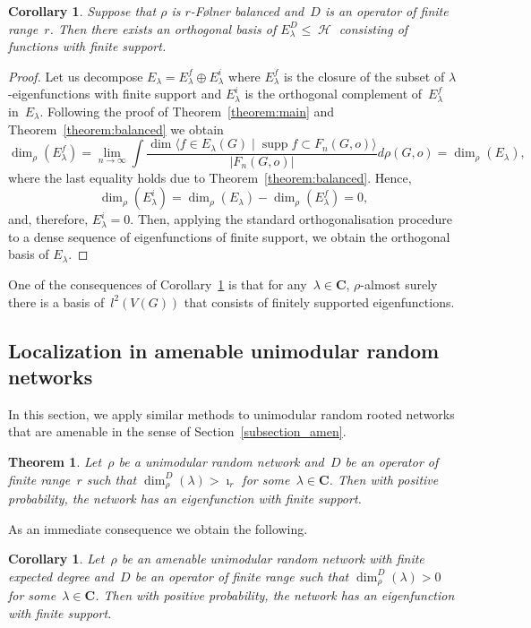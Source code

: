 \documentclass[english]{article}
\newtheorem{corollary}[lemma]{Corollary}
\newtheorem{theorem}[lemma]{Theorem}
\theoremstyle{definition}
\DeclareMathOperator{\supp}{supp}%
\DeclareMathOperator{\Hs}{{\mathcal{H}}}
\newcommand*{\field}[1]{\mathbf{#1}} %
\newcommand*\C{\field{C}} %
\begin{document}
\begin{corollary}\label{corollary:basis}
    Suppose that $\rho$ is $r$-{F\o lner} balanced and~$D$ is an operator of finite range~$r$. Then there exists an orthogonal basis of $E^D_\lambda \le \Hs$ consisting of functions with finite support. 
\end{corollary}
\begin{proof}
    Let us decompose $E_\lambda = E_\lambda^{f} \oplus E_\lambda^{i}$ where $E_\lambda^f$ is the closure of the subset of $\lambda$-eigenfunctions with finite support and $E_\lambda^{i}$ is the orthogonal complement of~$E_\lambda^f$ in~$E_\lambda$.  
    Following the proof of Theorem~\ref{theorem:main} and Theorem~\ref{theorem:balanced} we obtain 
    $$
    \dim_\rho(E_\lambda^f) = \lim_{n \to \infty}\int \frac{\dim \langle f \in E_\lambda(G) \mid \supp f \subset F_n(G,o)\rangle}{|F_n(G,o)|} d\rho(G,o) = \dim_\rho(E_\lambda),
    $$
    where the last equality holds due to Theorem~\ref{theorem:balanced}. Hence, 
    $$
    \dim_\rho(E_\lambda^i) = \dim_\rho(E_\lambda) - \dim_\rho(E_\lambda^f) = 0,
    $$
    and, therefore, $E_\lambda^i = 0$. Then, applying the standard orthogonalisation procedure to a dense sequence of eigenfunctions of finite support, we obtain the orthogonal basis of $E_\lambda$.
\end{proof}
One of the consequences of Corollary~\ref{corollary:basis} is that for any~$\lambda \in \C$, $\rho$-almost surely there is a basis of~$l^2(V(G))$ that consists of finitely supported eigenfunctions. 

\subsection{Localization in amenable unimodular random networks}\label{section_amen_theorem}

In this section, we apply similar methods to unimodular random rooted networks that are amenable in the sense of Section~\ref{subsection_amen}.

\begin{theorem}\label{theorem:isoperimetric}
    Let~$\rho$ be a unimodular random network and~$D$ be an operator of finite range~$r$ such that $\dim_\rho^D(\lambda) > \imath_r$ for some~$\lambda \in \C$. Then with positive probability, the network has an eigenfunction with finite support.  
\end{theorem}

As an immediate consequence we obtain the following.
\begin{corollary}\label{theorem:amenable}
    Let~$\rho$ be an amenable unimodular random network with finite expected degree and~$D$ be an operator of finite range such that $\dim_\rho^D(\lambda) > 0$ for some~$\lambda \in \C$. Then with positive probability, the network has an eigenfunction with finite support.  
\end{corollary}
\end{document}
